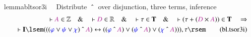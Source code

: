 \begin{restatable}{lemma}{bltsor3i}~~ Distribute $~\string^~$ over disjunction,
three terms, inference
\begin{align}
\vdash \mc{A} \in \mathbb{Z}\quad\&\quad \vdash \mc{D} \in
    \mathbb{R}\quad\&\quad \vdash \tau \in \mathbf{T}\quad\&\quad \vdash ( \tau
    + ( \mc{D} \times \mc{A} ) ) \in \mathbf{T}\quad\Rightarrow \notag \\%
     \quad \vdash
    \mathbf{I} \lsem ( ( ( \mw{\varphi} \vee \mw{\psi} \vee \mw{\chi} )
    ~\string^~ \mc{A} ) \leftrightarrow ( ( \mw{\varphi} ~\string^~ \mc{A} )
    \vee ( \mw{\psi} ~\string^~ \mc{A} ) \vee ( \mw{\chi} ~\string^~ \mc{A} ) )
    ) , \tau \rsem\label{eq:bl.tsor3i}\tag{bl.tsor3i}
\end{align}
\end{restatable}

